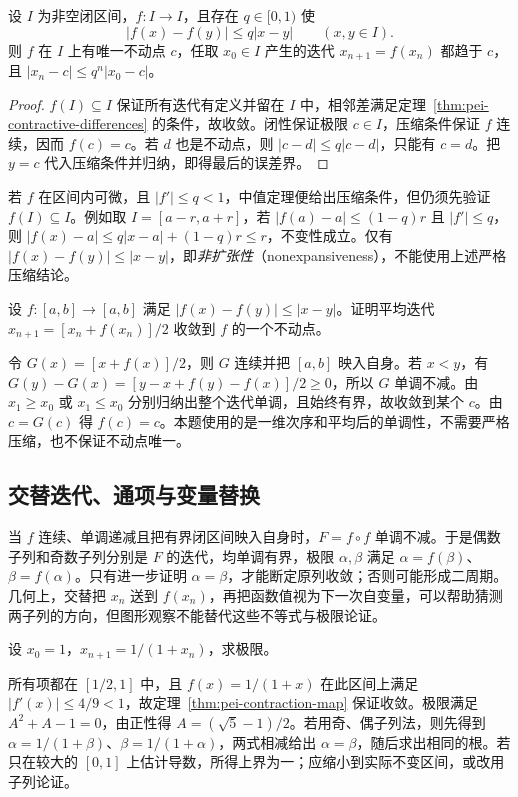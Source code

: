 \begin{theorem}[闭区间上的压缩迭代]
\label{thm:pei-contraction-map}
设 $I$ 为非空闭区间，$f:I\to I$，且存在 $q\in[0,1)$ 使
\[
    |f(x)-f(y)|\le q|x-y|\qquad(x,y\in I).
\]
则 $f$ 在 $I$ 上有唯一不动点 $c$，任取 $x_0\in I$ 产生的迭代 $x_{n+1}=f(x_n)$ 都趋于 $c$，且 $|x_n-c|\le q^n|x_0-c|$。
\end{theorem}
\begin{proof}
$f(I)\subseteq I$ 保证所有迭代有定义并留在 $I$ 中，相邻差满足定理~\ref{thm:pei-contractive-differences} 的条件，故收敛。闭性保证极限 $c\in I$，压缩条件保证 $f$ 连续，因而 $f(c)=c$。若 $d$ 也是不动点，则 $|c-d|\le q|c-d|$，只能有 $c=d$。把 $y=c$ 代入压缩条件并归纳，即得最后的误差界。
\end{proof}

若 $f$ 在区间内可微，且 $|f'|\le q<1$，中值定理便给出压缩条件，但仍须先验证 $f(I)\subseteq I$。例如取 $I=[a-r,a+r]$，若 $|f(a)-a|\le(1-q)r$ 且 $|f'|\le q$，则 $|f(x)-a|\le q|x-a|+(1-q)r\le r$，不变性成立。仅有 $|f(x)-f(y)|\le|x-y|$，即\emph{非扩张性}（nonexpansiveness），不能使用上述严格压缩结论。

\begin{example}
\label{ex:pei-averaged-nonexpansive}
设 $f:[a,b]\to[a,b]$ 满足 $|f(x)-f(y)|\le|x-y|$。证明平均迭代 $x_{n+1}=[x_n+f(x_n)]/2$ 收敛到 $f$ 的一个不动点。
\end{example}
\begin{solve}
令 $G(x)=[x+f(x)]/2$，则 $G$ 连续并把 $[a,b]$ 映入自身。若 $x<y$，有 $G(y)-G(x)=[y-x+f(y)-f(x)]/2\ge0$，所以 $G$ 单调不减。由 $x_1\ge x_0$ 或 $x_1\le x_0$ 分别归纳出整个迭代单调，且始终有界，故收敛到某个 $c$。由 $c=G(c)$ 得 $f(c)=c$。本题使用的是一维次序和平均后的单调性，不需要严格压缩，也不保证不动点唯一。
\end{solve}

\subsection{交替迭代、通项与变量替换}

当 $f$ 连续、单调递减且把有界闭区间映入自身时，$F=f\circ f$ 单调不减。于是偶数子列和奇数子列分别是 $F$ 的迭代，均单调有界，极限 $\alpha,\beta$ 满足 $\alpha=f(\beta)$、$\beta=f(\alpha)$。只有进一步证明 $\alpha=\beta$，才能断定原列收敛；否则可能形成二周期。几何上，交替把 $x_n$ 送到 $f(x_n)$，再把函数值视为下一次自变量，可以帮助猜测两子列的方向，但图形观察不能替代这些不等式与极限论证。

\begin{example}
\label{ex:pei-golden-recursion}
设 $x_0=1$，$x_{n+1}=1/(1+x_n)$，求极限。
\end{example}
\begin{solve}
所有项都在 $[1/2,1]$ 中，且 $f(x)=1/(1+x)$ 在此区间上满足 $|f'(x)|\le4/9<1$，故定理~\ref{thm:pei-contraction-map} 保证收敛。极限满足 $A^2+A-1=0$，由正性得 $A=(\sqrt5-1)/2$。若用奇、偶子列法，则先得到 $\alpha=1/(1+\beta)$、$\beta=1/(1+\alpha)$，两式相减给出 $\alpha=\beta$，随后求出相同的根。若只在较大的 $[0,1]$ 上估计导数，所得上界为一；应缩小到实际不变区间，或改用子列论证。
\end{solve}

